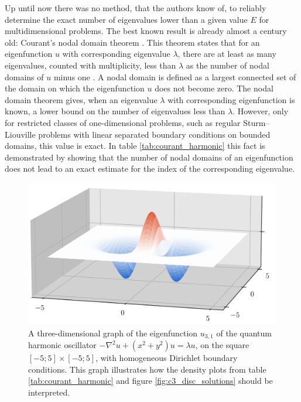 Up until now there was no method, that the authors know of, to reliably determine the exact number of eigenvalues lower than a given value $E$ for multidimensional problems. The best known result is already almost a century old: Courant's nodal domain theorem \cite[Vol I, Chapter  VI, paragraph 2, Theorem 2]{courant_methods_2008}. This theorem states that for an eigenfunction $u$ with corresponding eigenvalue $\lambda$, there are at least as many eigenvalues, counted with multiplicity, less than $\lambda$ as the number of nodal domains of $u$ minus one \cite[Theorem 1.1]{berard_nodal_2014}. A nodal domain is defined as a largest connected set of the domain on which the eigenfunction $u$ does not become zero. The nodal domain theorem gives, when an eigenvalue $\lambda$ with corresponding eigenfunction is known, a lower bound on the number of eigenvalues less than $\lambda$. However, only for restricted classes of one-dimensional problems, such as regular Sturm--Liouville problems with linear separated boundary conditions on bounded domains, this value is exact. In table \ref{tab:courant_harmonic} this fact is demonstrated by showing that the number of nodal domains of an eigenfunction does not lead to an exact estimate for the index of the corresponding eigenvalue.

\begin{figure}
  \begin{center}
    \includegraphics[width=\linewidth]{img/chapter3/counting/harmonic_3d.png}
    \caption{\label{fig:harmonic_3d} A three-dimensional graph of the eigenfunction $u_{3,1}$ of the quantum harmonic oscillator $-\nabla^2 u + (x^2+y^2) u = \lambda u$, on the square $[-5; 5] \times [-5; 5]$, with homogeneous Dirichlet boundary conditions. This graph illustrates how the density plots from table \ref{tab:courant_harmonic} and figure \ref{fig:c3_disc_solutions} should be interpreted.}
  \end{center}
\end{figure}

